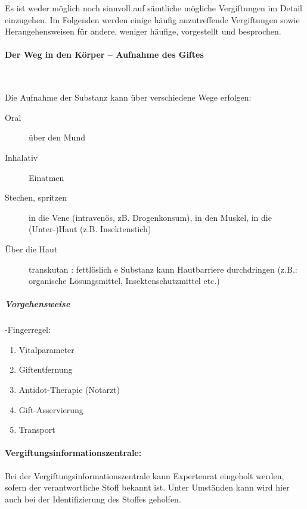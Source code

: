 Es ist weder möglich noch sinnvoll auf sämtliche mögliche
Vergiftungen im Detail einzugehen. Im Folgenden werden
einige häufig anzutreffende Vergiftungen sowie
Herangehensweisen für andere, weniger häufige, vorgestellt
und besprochen. 






\paragraph{Der Weg in den Körper -- Aufnahme des Giftes}~

Die Aufnahme der Substanz kann über verschiedene Wege
erfolgen:

\begin{description}
    \item[Oral] über den Mund 
    \item[Inhalativ] Einatmen
    \item[Stechen, spritzen] in die Vene (intravenös, zB.
    Drogenkonsum), in den Muskel, in die (Unter-)Haut (z.B.
    Insektenstich)
    \item[Über die Haut] transkutan : fettlöslich e Substanz kann  Hautbarriere durchdringen
(z.B.:  organische Lösungsmittel,  Insektenschutzmittel etc.)
\end{description}




\subparagraph*{Vorgehensweise}

{-Fingerregel:}

\begin{enumerate}
\item Vitalparameter
\item Giftentfernung
\item Antidot-Therapie (Notarzt)
\item Gift-Asservierung
\item Transport
\end{enumerate}

\paragraph{Vergiftungsinformationszentrale:}


Bei der Vergiftungsinformationszentrale kann Expertenrat
eingeholt werden, sofern der verantwortliche Stoff bekannt
ist. Unter Umständen kann wird hier auch bei der
Identifizierung des Stoffes geholfen.


